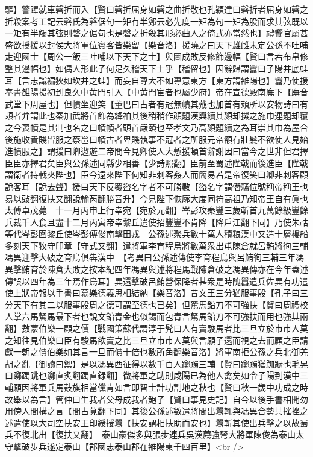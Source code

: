 驅】警蹕就車磬折而入【賢曰磬折屈身如磬之曲折敬也孔穎達曰磬折者屈身如磬之折殺案考工記云磬氏為磬倨句一矩有半鄭云必先度一矩為句一矩為股而求其弦既以一矩有半觸其弦則磬之倨句也是磬之折殺其形必曲人之倚式亦當然也】禮饗官屬甚盛欲授援以封侯大將軍位賓客皆樂留【樂音洛】援曉之曰天下雄雌未定公孫不吐哺走迎國士【周公一飯三吐哺以下天下之士】與圖成敗反修飾邊幅【賢曰言若布帛修整其邊幅也】如偶人形此子何足久稽天下士乎【稽留也】因辭歸謂囂曰子陽井底蛙耳【言志識褊狹如坎井之蛙】而妄自尊大不如專意東方【東方謂雒陽也】囂乃使援奉書雒陽援初到良久中黄門引入【中黄門宦者也屬少府】帝在宣德殿南廡下【廡音武堂下周屋也】但幘坐迎笑【董巴曰古者有冠無幘其戴也加首有頍所以安物詩曰有頍者弁謂此也秦加武將首飾為絳袙其後稍稍作顔題漢興續其顔却摞之施巾連題却覆之今喪幘是其制也名之曰幘幘者頭首嚴賾也至孝文乃高顔題續之為耳崇其巾為屋合後施收貴賤皆服之蔡邕曰幘古者卑賤執事不冠者之所服元帝頟有壯髪不欲使人見始進幘服之】謂援曰卿遨遊二帝間今見卿使人大慙援頓首辭謝因曰當今之世非但君擇臣臣亦擇君矣臣與公孫述同縣少相善【少詩照翻】臣前至蜀述陛戟而後進臣【陛戟謂衛者持戟夾陛也】臣今遠來陛下何知非刺客姦人而簡易若是帝復笑曰卿非刺客顧說客耳【說去聲】援曰天下反覆盜名字者不可勝數【盜名字謂僭竊位號稱帝稱王也易以䜴翻復扶又翻說輸芮翻勝音升】今見陛下恢廓大度同符高祖乃知帝王自有眞也　太傅卓茂薨　十一月丙申上行幸宛【宛於元翻】岑彭攻秦豐三歲斬首九萬餘級豐餘兵裁千人食且盡十二月丙寅帝幸黎丘遣使招豐豐不肯降【降戶江翻下同】乃使朱祜等代岑彭圍黎丘使岑彭傅俊南擊田戎　公孫述聚兵數十萬人積粮漢中又造十層樓船多刻天下牧守印章【守式又翻】遣將軍李育程烏將數萬衆出屯陳倉就呂鮪將徇三輔馮異迎擊大破之育烏俱犇漢中　【考異曰公孫述傳使李育程烏與呂鮪徇三輔三年馮異擊鮪育於陳倉大敗之按本紀四年馮異與述將程馬戰陳倉破之馮異傳亦在今年蓋述傳誤以四年為三年焉作烏耳】異還擊破呂鮪營保降者甚衆是時隗囂遣兵佐異有功遣使上狀帝報以手書曰慕樂德義思相結納【樂音洛】昔文王三分猶服事殷【孔子曰三分天下有其二以服事殷周之德可謂至德也已矣】但駑馬鉛刀不可強扶【賢曰周禮校人掌六馬駑馬最下者也說文鉛青金也似錫而包青言駑馬鉛刀不可強扶而用也強其兩翻】數蒙伯樂一顧之價【戰國策蘇代謂淳于髠曰人有賣駿馬者比三旦立於市市人莫之知往見伯樂曰臣有駿馬欲賣之比三旦立市市人莫與言願子還而視之去而顧之臣請獻一朝之價伯樂如其言一旦而價十倍也數所角翻樂音洛】將軍南拒公孫之兵北御羌胡之亂【御讀曰禦】是以馮異西征得以數千百人躑躅三輔【賢曰躑躅猶踟蹰也毛晃曰躑躅跳也躑直炙翻躅直録翻】微將軍之助則咸陽已為他人禽矣如令子陽到漢中三輔願因將軍兵馬鼔旗相當儻肯如言即智士計功割地之秋也【賢曰秋一歲中功成之時故舉以為言】管仲曰生我者父母成我者鮑子【賢曰事見史記】自今以後手書相聞勿用傍人間構之言【間古莧翻下同】其後公孫述數遣將間出囂輒與馮異合勢共摧挫之述遣使以大司空扶安王印綬授囂【扶安謂相扶助而安也】囂斬其使出兵擊之以故蜀兵不復北出【復扶又翻】　泰山豪傑多與張步連兵吳漢薦強弩大將軍陳俊為泰山太守擊破步兵遂定泰山【郡國志泰山郡在雒陽東千四百里】<br />
